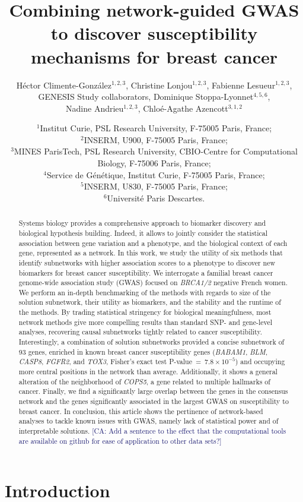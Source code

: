 \documentclass[twocolumn, 11pt]{article}
\title{Combining network-guided GWAS to discover susceptibility mechanisms for breast cancer}
\author{Héctor Climente-González$^{1,2,3}$, Christine Lonjou$^{1,2,3}$, Fabienne Lesueur$^{1,2,3}$, \\
GENESIS Study collaborators, Dominique Stoppa-Lyonnet$^{4,5,6}$, \\
Nadine Andrieu$^{1,2,3}$, Chloé-Agathe Azencott$^{3,1,2}$}
\date{$^{1}$Institut Curie, PSL Research University, F-75005 Paris, France;\\
  $^{2}$INSERM, U900, F-75005 Paris, France;\\
  $^{3}$MINES ParisTech, PSL Research University, CBIO-Centre for Computational Biology, F-75006 Paris, France;\\
  $^{4}$Service de Génétique, Institut Curie, F-75005 Paris, France;\\
  $^{5}$INSERM, U830, F-75005 Paris, France;\\
  $^{6}$Université Paris Descartes.\\
}
\newcommand{\cazcom}[2]{{\uline{#1}}\unskip\space\textcolor{MidnightBlue}{[CA: #2]}}
\begin{document}
\onecolumn
\maketitle

\begin{abstract}
Systems biology provides a comprehensive approach to biomarker discovery and biological hypothesis building. Indeed, it allows to jointly consider the statistical association between gene variation and a phenotype, and the biological context of each gene, represented as a network. In this work, we study the utility of six methods that identify subnetworks with higher association scores to a phenotype to discover new biomarkers for breast cancer susceptibility. We interrogate a familial breast cancer genome-wide association study (GWAS) focused on \emph{BRCA1/2} negative French women. We perform an in-depth benchmarking of the methods with regards to size of the solution subnetwork, their utility as biomarkers, and the stability and the runtime of the methods. By trading statistical stringency for biological meaningfulness, most network methods give more compelling results than standard SNP- and gene-level analyses, recovering causal subnetworks tightly related to cancer susceptibility. Interestingly, a combination of solution subnetworks provided a concise subnetwork of 93 genes, enriched in known breast cancer susceptibility genes (\emph{BABAM1}, \emph{BLM}, \emph{CASP8}, \emph{FGFR2}, and \emph{TOX3}, Fisher's exact test P-value~=~$7.8 \times 10^{-5}$) and occupying more central positions in the network than average. Additionally, it shows a general alteration of the neighborhood of \emph{COPS5}, a gene related to multiple hallmarks of cancer. Finally, we find a significantly large overlap between the genes in the consensus network and the genes significantly associated in the largest GWAS on susceptibility to breast cancer. In conclusion, this article shows the pertinence of network-based analyses to tackle known issues with GWAS, namely lack of statistical power and of interpretable solutions.
\cazcom{}{Add a sentence to the effect that the computational tools are available on github for ease of application to other data sets?}
\end{abstract}

\section{Introduction}
\end{document}
